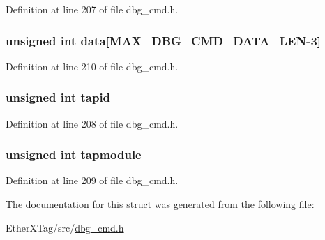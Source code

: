 Definition at line 207 of file dbg\-\_\-cmd.\-h.

\hypertarget{structdbg__cmd__type__read__jtag__reg_a728dc245dc576de10147524d6a701ef3}{
\subsubsection[{data}]{\setlength{\rightskip}{0pt plus 5cm}unsigned int data\mbox{[}{\bf M\-A\-X\-\_\-\-D\-B\-G\-\_\-\-C\-M\-D\-\_\-\-D\-A\-T\-A\-\_\-\-L\-E\-N}-\/3\mbox{]}}}\label{structdbg__cmd__type__read__jtag__reg_a728dc245dc576de10147524d6a701ef3}


Definition at line 210 of file dbg\-\_\-cmd.\-h.

\hypertarget{structdbg__cmd__type__read__jtag__reg_ab45a32c579f91cd302a98e9f3000e245}{
\subsubsection[{tapid}]{\setlength{\rightskip}{0pt plus 5cm}unsigned int tapid}}\label{structdbg__cmd__type__read__jtag__reg_ab45a32c579f91cd302a98e9f3000e245}


Definition at line 208 of file dbg\-\_\-cmd.\-h.

\hypertarget{structdbg__cmd__type__read__jtag__reg_a81cc17fe846b9d6fa02f6ebccb89a542}{
\subsubsection[{tapmodule}]{\setlength{\rightskip}{0pt plus 5cm}unsigned int tapmodule}}\label{structdbg__cmd__type__read__jtag__reg_a81cc17fe846b9d6fa02f6ebccb89a542}


Definition at line 209 of file dbg\-\_\-cmd.\-h.



The documentation for this struct was generated from the following file\-:\begin{DoxyCompactItemize}
\item 
Ether\-X\-Tag/src/\hyperlink{dbg__cmd_8h}{dbg\-\_\-cmd.\-h}\end{DoxyCompactItemize}
